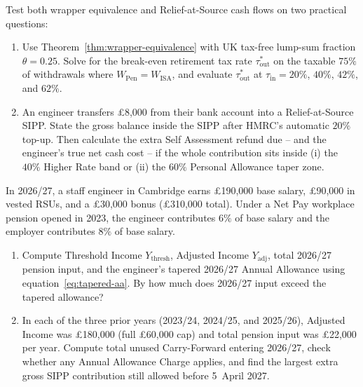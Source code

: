 \begin{exercise}
Test both wrapper equivalence and Relief-at-Source cash flows on two practical questions:
\begin{enumerate}[label=(\alph*)]
  \item Use Theorem~\ref{thm:wrapper-equivalence} with UK tax-free lump-sum fraction $\theta = 0.25$. Solve for the break-even retirement tax rate $\tau_{\text{out}}^*$ on the taxable $75\%$ of withdrawals where $W_{\text{Pen}} = W_{\text{ISA}}$, and evaluate $\tau_{\text{out}}^*$ at $\tau_{\text{in}} = 20\%$, $40\%$, $42\%$, and $62\%$.
  \item An engineer transfers \pounds 8,000 from their bank account into a Relief-at-Source SIPP. State the gross balance inside the SIPP after HMRC's automatic $20\%$ top-up. Then calculate the extra Self Assessment refund due -- and the engineer's true net cash cost -- if the whole contribution sits inside (i) the $40\%$ Higher Rate band or (ii) the $60\%$ Personal Allowance taper zone.
\end{enumerate}
\end{exercise}

\begin{exercise}
In 2026/27, a staff engineer in Cambridge earns \pounds 190,000 base salary, \pounds 90,000 in vested RSUs, and a \pounds 30,000 bonus (\pounds 310,000 total). Under a Net Pay workplace pension opened in 2023, the engineer contributes $6\%$ of base salary and the employer contributes $8\%$ of base salary.
\begin{enumerate}[label=(\alph*)]
  \item Compute Threshold Income $Y_{\text{thresh}}$, Adjusted Income $Y_{\text{adj}}$, total 2026/27 pension input, and the engineer's tapered 2026/27 Annual Allowance using equation~\eqref{eq:tapered-aa}. By how much does 2026/27 input exceed the tapered allowance?
  \item In each of the three prior years (2023/24, 2024/25, and 2025/26), Adjusted Income was \pounds 180,000 (full \pounds 60,000 cap) and total pension input was \pounds 22,000 per year. Compute total unused Carry-Forward entering 2026/27, check whether any Annual Allowance Charge applies, and find the largest extra gross SIPP contribution still allowed before 5~April 2027.
\end{enumerate}
\end{exercise}

